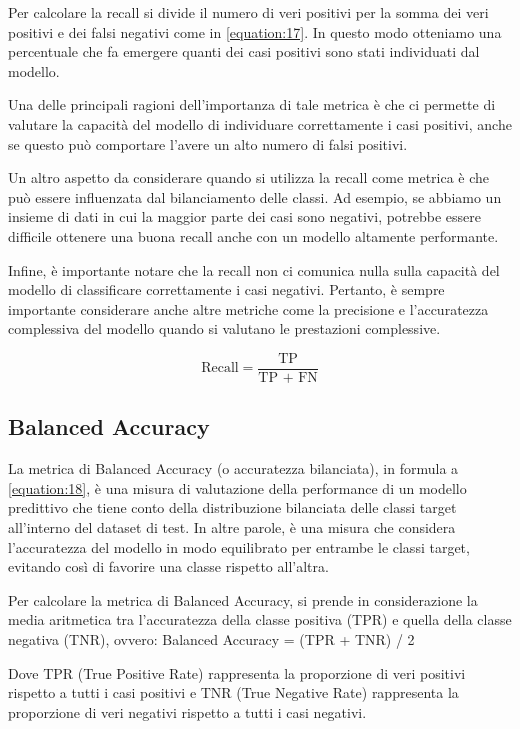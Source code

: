 Per calcolare la recall si divide il numero di veri positivi per la somma dei veri positivi e dei falsi negativi come in \ref{equation:17}. In questo modo otteniamo una percentuale che fa emergere quanti dei casi positivi sono stati individuati dal modello.

Una delle principali ragioni dell’importanza di tale metrica è che ci permette di valutare la capacità del modello di individuare correttamente i casi positivi, anche se questo può comportare l’avere un alto numero di falsi positivi.

Un altro aspetto da considerare quando si utilizza la recall come metrica è che può essere influenzata dal bilanciamento delle classi. Ad esempio, se abbiamo un insieme di dati in cui la maggior parte dei casi sono negativi, potrebbe essere difficile ottenere una buona recall anche con un modello altamente performante.

Infine, è importante notare che la recall non ci comunica nulla sulla capacità del modello di classificare correttamente i casi negativi. Pertanto, è sempre importante considerare anche altre metriche come la precisione e l'accuratezza complessiva del modello quando si valutano le prestazioni complessive.

\begin{equation}
    \text{Recall} = \frac{\text{TP}}{\text{TP + FN}}
    \label{equation:17}
\end{equation}

\subsection{Balanced Accuracy}
La metrica di Balanced Accuracy (o accuratezza bilanciata), in formula a \ref{equation:18}, è una misura di valutazione della performance di un modello predittivo che tiene conto della distribuzione bilanciata delle classi target all'interno del dataset di test. In altre parole, è una misura che considera l'accuratezza del modello in modo equilibrato per entrambe le classi target, evitando così di favorire una classe rispetto all'altra.

Per calcolare la metrica di Balanced Accuracy, si prende in considerazione la media aritmetica tra l'accuratezza della classe positiva (TPR) e quella della classe negativa (TNR), ovvero:
Balanced Accuracy = (TPR + TNR) / 2
 
Dove TPR (True Positive Rate) rappresenta la proporzione di veri positivi rispetto a tutti i casi positivi e TNR (True Negative Rate) rappresenta la proporzione di veri negativi rispetto a tutti i casi negativi.

